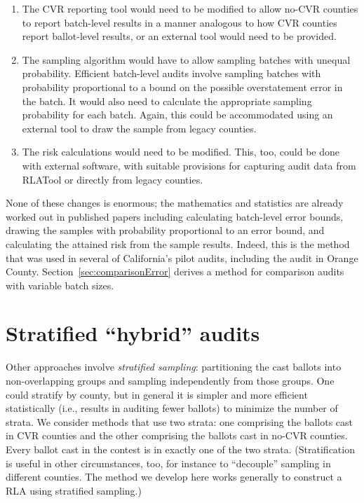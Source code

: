 \documentclass[runningheads]{llncs}
\begin{document}
\begin{enumerate}

  \item The CVR reporting tool would need to be modified to allow no-CVR counties to
report batch-level results in a manner analogous to how CVR counties report
ballot-level results, or an external tool would need to be provided.

  \item The sampling
algorithm would have to allow sampling batches with unequal probability.
Efficient batch-level audits involve sampling batches with probability proportional
to a bound on the possible overstatement error in the batch.
It would also need to calculate the appropriate sampling probability for each batch.
Again, this could be accommodated using an external tool to draw the sample from legacy counties.

  \item The risk calculations would need to be modified. 
This, too, could be done with external software, with suitable provisions for capturing audit data
from RLATool or directly from legacy counties.
\end{enumerate}

None of these changes is enormous; the mathematics and statistics are already worked out
in published papers \cite{stark09c,stark09b,stark10d} including calculating
batch-level error bounds, drawing the samples with probability proportional to an
error bound, and calculating the attained risk from the sample results.
Indeed, this is the method that was used in several of California's pilot audits,
including the audit in Orange County.
Section~\ref{sec:comparisonError} derives a method for comparison audits with variable batch sizes.

\section{Stratified ``hybrid'' audits} \label{sec:hybrid}

Other approaches involve \emph{stratified sampling}: partitioning the cast ballots
into non-overlapping groups and sampling independently from those groups.
One could stratify by county, but in general it is simpler and more efficient
statistically (i.e., results in auditing fewer ballots) to minimize the number of strata.
We consider methods that use two strata: one comprising the ballots cast in CVR counties and the other comprising the ballots cast in
no-CVR counties. 
Every ballot cast in the contest is in 
exactly one of the two strata. 
(Stratification is useful in other circumstances, too, for instance to ``decouple'' sampling
in different counties.
The method we develop here works generally to construct a RLA using stratified sampling.)
\end{document}
